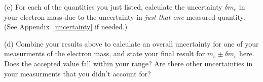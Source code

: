 (c) For each of the quantities you just listed, calculate the uncertainty $\delta m_e$ in your electron mass due to the uncertainty in \textit{just that one} measured quantity.  (See Appendix~\ref{uncertainty} if needed.)
\answerspace{1.5in}

(d) Combine your results above to calculate an overall uncertainty for one of your measurments of the electron mass, and state your final result for $m_e \pm \delta m_e$ here.   Does the accepted value fall within your range?  Are there other uncertainties in your measurments that you didn't account for? 



